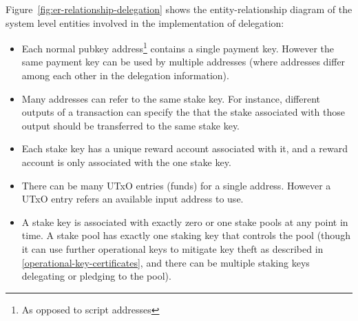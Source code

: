 \documentclass[11pt,a4paper]{article}
\begin{document}
Figure~\ref{fig:er-relationship-delegation} shows the entity-relationship
diagram of the system level entities involved in the implementation of
delegation:
\begin{itemize}
\item Each normal pubkey address\footnote{As opposed to script addresses}
  contains a single payment key. However the same payment key
  can be used by multiple addresses (where addresses differ among each other in
  the delegation information).
\item Many addresses can refer to the same stake key. For instance, different
  outputs of a transaction can specify the that the stake associated with those
  output should be transferred to the same stake key.
\item Each stake key has a unique reward account associated with it, and a
  reward account is only associated with the one stake key.
\item There can be many UTxO entries (funds) for a single address. However a
  UTxO entry refers an available input address to use.
\item A stake key is associated with exactly zero or one stake pools
  at any point in time. A stake pool has exactly one staking key that
  controls the pool (though it can use further operational keys to
  mitigate key theft as described in
  \cref{operational-key-certificates}, and there can be multiple
  staking keys delegating or pledging to the pool).
\end{itemize}
\end{document}
